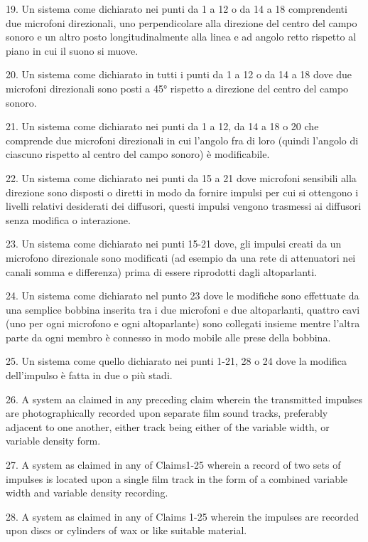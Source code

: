 \documentclass[11pt]{article}
\begin{document}
\begin{multicols*}{2}
19. Un sistema come dichiarato nei punti da 1 a 12 o da 14 a 18 comprendenti due microfoni direzionali, uno perpendicolare alla direzione del centro del campo sonoro e un altro posto longitudinalmente alla linea e ad angolo retto rispetto al piano in cui il suono si muove.

20. Un sistema come dichiarato in tutti i punti da 1 a 12 o da 14 a 18 dove due microfoni direzionali sono posti a 45° rispetto a direzione del centro del campo sonoro.

21. Un sistema come dichiarato nei punti da 1 a 12, da 14 a 18 o 20 che comprende due microfoni direzionali in cui l’angolo fra di loro (quindi l’angolo di ciascuno rispetto al centro del campo sonoro) è modificabile.

22. Un sistema come dichiarato nei punti da 15 a 21 dove microfoni sensibili alla direzione sono disposti o diretti in modo da fornire impulsi per cui si ottengono i livelli relativi desiderati dei diffusori, questi impulsi vengono trasmessi ai diffusori senza modifica o interazione.

23. Un sistema come dichiarato nei punti 15-21 dove, gli impulsi creati da un microfono direzionale sono modificati (ad esempio da una rete di attenuatori nei canali somma e differenza) prima di essere riprodotti dagli altoparlanti.

24. Un sistema come dichiarato nel punto 23 dove le modifiche sono effettuate da una semplice bobbina inserita tra i due microfoni e due altoparlanti, quattro cavi (uno per ogni microfono e ogni altoparlante) sono collegati insieme mentre l'altra parte da ogni membro è connesso in modo mobile alle prese della bobbina. 

25. Un sistema come quello dichiarato nei punti 1-21, 28 o 24 dove la modifica dell'impulso è fatta in due o più stadi.

26. A system aa claimed in any preceding claim wherein the transmitted impulses are photographically recorded upon separate film sound tracks, preferably adjacent to one another, either track being either of the variable width, or variable density form.

27. A system as claimed in any of Claims1-25 wherein a record of two sets of impulses is located upon a single film track in the form of a combined variable width and variable density recording. 

28. A system as claimed in any of Claims 1-25 wherein the impulses are recorded upon discs or cylinders of wax or like suitable material.


\end{multicols*}
\end{document}

